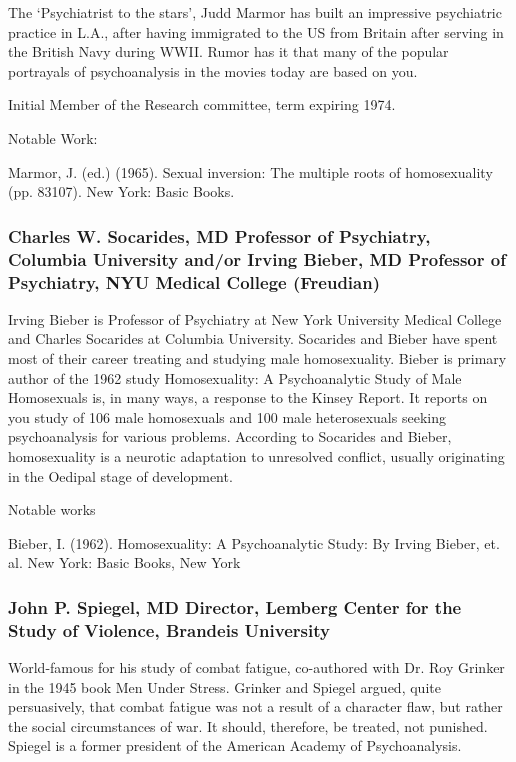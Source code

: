 The `Psychiatrist to the stars', Judd Marmor has built an impressive psychiatric practice in L.A., after having immigrated to the US from Britain after serving in the British Navy during WWII. Rumor has it that many of the popular portrayals of psychoanalysis in the movies today are based on you.

Initial Member of the Research committee, term expiring 1974.

Notable Work:

Marmor, J. (ed.) (1965). Sexual inversion: The multiple roots of homosexuality (pp. 83107). New York: Basic Books.

\subsubsection{Charles W. Socarides, MD Professor of Psychiatry, Columbia University and\slash or Irving Bieber, MD Professor of Psychiatry, NYU Medical College (Freudian)}
\label{charlesw.socaridesmdprofessorofpsychiatrycolumbiauniversityandorirvingbiebermdprofessorofpsychiatrynyumedicalcollegefreudian}

Irving Bieber is Professor of Psychiatry at New York University Medical College and Charles Socarides at Columbia University. Socarides and Bieber have spent most of their career treating and studying male homosexuality. Bieber is primary author of the 1962 study Homosexuality: A Psychoanalytic Study of Male Homosexuals is, in many ways, a response to the Kinsey Report. It reports on you study of 106 male homosexuals and 100 male heterosexuals seeking psychoanalysis for various problems. According to Socarides and Bieber, homosexuality is a neurotic adaptation to unresolved conflict, usually originating in the Oedipal stage of development.

Notable works

Bieber, I. (1962). Homosexuality: A Psychoanalytic Study: By Irving Bieber, et. al. New York: Basic Books, New York

\subsubsection{John P. Spiegel, MD Director, Lemberg Center for the Study of Violence, Brandeis University}
\label{johnp.spiegelmddirectorlembergcenterforthestudyofviolencebrandeisuniversity}

World-famous for his study of combat fatigue, co-authored with Dr. Roy Grinker in the 1945 book Men Under Stress. Grinker and Spiegel argued, quite persuasively, that combat fatigue was not a result of a character flaw, but rather the social circumstances of war. It should, therefore, be treated, not punished. Spiegel is a former president of the American Academy of Psychoanalysis.

